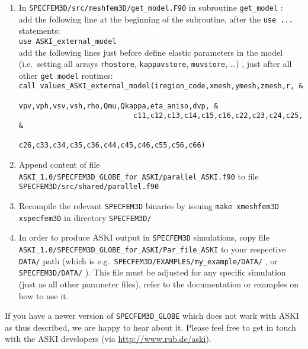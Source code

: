 \documentclass[12pt,a4paper]{article}
\newcommand{\lcode}[1]{\nolinkurl{#1}}
\newcommand{\ASKI}{ {\ttfamily ASKI} }
\begin{document}
\begin{enumerate}
 \item In \lcode{SPECFEM3D/src/meshfem3D/get_model.F90} in subroutine \lcode{get_model} : \\
   add the following line at the beginning of the subroutine, after the \lcode{use ...} statements:\\
   \lcode{use ASKI_external_model}\\
   add the following lines just before define elastic parameters in the model (i.e.\ setting all 
   arrays \lcode{rhostore}, \lcode{kappavstore}, \lcode{muvstore}, \dots) , just after all other 
   \lcode{get model} routines:\\
   \lcode{call values_ASKI_external_model(iregion_code,xmesh,ymesh,zmesh,r, &}\\
   \lcode{                           vpv,vph,vsv,vsh,rho,Qmu,Qkappa,eta_aniso,dvp, &}\\
   \lcode{                           c11,c12,c13,c14,c15,c16,c22,c23,c24,c25, &}\\
   \lcode{                           c26,c33,c34,c35,c36,c44,c45,c46,c55,c56,c66)}

 \item Append content of file \lcode{ASKI_1.0/SPECFEM3D_GLOBE_for_ASKI/parallel_ASKI.f90} 
   to file \lcode{SPECFEM3D/src/shared/parallel.f90}

\item Recompile the relevant \lcode{SPECFEM3D} binaries by issuing \lcode{make xmeshfem3D xspecfem3D} 
  in directory \lcode{SPECFEM3D/}

\item In order to produce \ASKI output in \lcode{SPECFEM3D} simulations, copy file 
    \lcode{ASKI_1.0/SPECFEM3D_GLOBE_for_ASKI/Par_file_ASKI} to your respective \lcode{DATA/} path
    (which is e.g.\ \lcode{SPECFEM3D/EXAMPLES/my_example/DATA/} , or \lcode{SPECFEM3D/DATA/} ). This 
    file must be adjusted for any specific simulation (just as all other parameter files), 
    refer to the documentation or examples on how to use it.

\end{enumerate}

If you have a newer version of \lcode{SPECFEM3D_GLOBE} which does not work with \ASKI as thus described, we
are happy to hear about it. Please feel free to get in touch with the \ASKI developers (via
\url{http://www.rub.de/aski}). 

%
\end{document}
